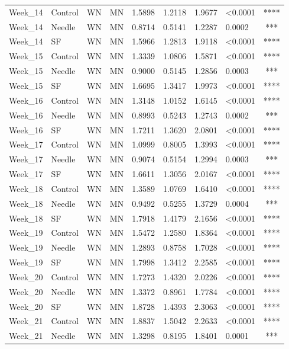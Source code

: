 \documentclass[
  12pt,
  letterpaper,
]{article}
\begin{document}
\begin{longtable}{llccrrrlc}
Week\_14 & Control & WN & MN & 1.5898 & 1.2118 & 1.9677 & <0.0001 & **** \\ 
Week\_14 & Needle & WN & MN & 0.8714 & 0.5141 & 1.2287 & 0.0002 & *** \\ 
Week\_14 & SF & WN & MN & 1.5966 & 1.2813 & 1.9118 & <0.0001 & **** \\ 
Week\_15 & Control & WN & MN & 1.3339 & 1.0806 & 1.5871 & <0.0001 & **** \\ 
Week\_15 & Needle & WN & MN & 0.9000 & 0.5145 & 1.2856 & 0.0003 & *** \\ 
Week\_15 & SF & WN & MN & 1.6695 & 1.3417 & 1.9973 & <0.0001 & **** \\ 
Week\_16 & Control & WN & MN & 1.3148 & 1.0152 & 1.6145 & <0.0001 & **** \\ 
Week\_16 & Needle & WN & MN & 0.8993 & 0.5243 & 1.2743 & 0.0002 & *** \\ 
Week\_16 & SF & WN & MN & 1.7211 & 1.3620 & 2.0801 & <0.0001 & **** \\ 
Week\_17 & Control & WN & MN & 1.0999 & 0.8005 & 1.3993 & <0.0001 & **** \\ 
Week\_17 & Needle & WN & MN & 0.9074 & 0.5154 & 1.2994 & 0.0003 & *** \\ 
Week\_17 & SF & WN & MN & 1.6611 & 1.3056 & 2.0167 & <0.0001 & **** \\ 
Week\_18 & Control & WN & MN & 1.3589 & 1.0769 & 1.6410 & <0.0001 & **** \\ 
Week\_18 & Needle & WN & MN & 0.9492 & 0.5255 & 1.3729 & 0.0004 & *** \\ 
Week\_18 & SF & WN & MN & 1.7918 & 1.4179 & 2.1656 & <0.0001 & **** \\ 
Week\_19 & Control & WN & MN & 1.5472 & 1.2580 & 1.8364 & <0.0001 & **** \\ 
Week\_19 & Needle & WN & MN & 1.2893 & 0.8758 & 1.7028 & <0.0001 & **** \\ 
Week\_19 & SF & WN & MN & 1.7998 & 1.3412 & 2.2585 & <0.0001 & **** \\ 
Week\_20 & Control & WN & MN & 1.7273 & 1.4320 & 2.0226 & <0.0001 & **** \\ 
Week\_20 & Needle & WN & MN & 1.3372 & 0.8961 & 1.7784 & <0.0001 & **** \\ 
Week\_20 & SF & WN & MN & 1.8728 & 1.4393 & 2.3063 & <0.0001 & **** \\ 
Week\_21 & Control & WN & MN & 1.8837 & 1.5042 & 2.2633 & <0.0001 & **** \\ 
Week\_21 & Needle & WN & MN & 1.3298 & 0.8195 & 1.8401 & 0.0001 & *** \\ 

\end{longtable}
\end{document}
